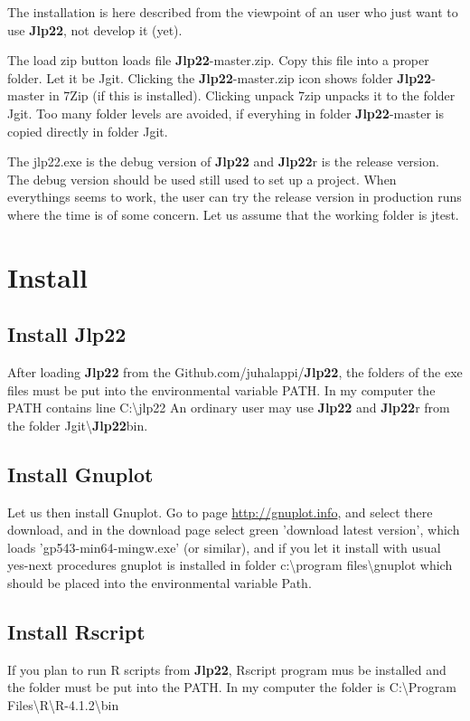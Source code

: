 The installation is here described from the viewpoint of an user 
who just want to use \textbf{Jlp22}, not develop it (yet). 
 
The load zip button loads file \textbf{Jlp22}-master.zip. Copy this file into a proper folder. 
Let it be Jgit. Clicking the \textbf{Jlp22}-master.zip icon shows folder \textbf{Jlp22}-master in 
7Zip (if this is installed). Clicking unpack 7zip unpacks it to the folder Jgit. 
Too many folder levels are avoided, if everyhing in folder \textbf{Jlp22}-master 
is copied directly in 
folder Jgit. 
 
The jlp22.exe is the debug version of \textbf{Jlp22} and \textbf{Jlp22}r is the release version. 
The debug version should be 
used still used to set up a project. When everythings seems to work, the user 
can try the release version in production runs where the time is of some concern. 
Let us assume that the working folder is jtest. 
\section{Install} 
\label{install} 
\subsection{Install \textbf{Jlp22}} 
\label{installjlp22} 
After loading \textbf{Jlp22} from the Github.com/juhalappi/\textbf{Jlp22}, the folders of the exe files must be 
put into the environmental variable PATH. In my computer the PATH contains line C:\textbackslash jlp22 
An ordinary user may use \textbf{Jlp22} and \textbf{Jlp22}r from the folder 
Jgit\textbackslash \textbf{Jlp22}bin. 
\subsection{Install Gnuplot} 
\label{installgnuplot} 
Let us then install Gnuplot. Go to page \url{http://gnuplot.info}, and select there download, 
and in the download page select green 'download latest version', which loads 
'gp543-min64-mingw.exe' (or similar), and if you let it install with usual yes-next procedures 
gnuplot is installed  in folder c:\textbackslash program files\textbackslash gnuplot 
which should be placed into the environmental variable Path. 
\subsection{Install Rscript} 
\label{installrscript} 
 
If you plan to run R scripts from \textbf{Jlp22}, Rscript program mus be installed 
and the folder must be put into the PATH. In my computer the folder is 
C:\textbackslash Program Files\textbackslash R\textbackslash R-4.1.2\textbackslash bin 
